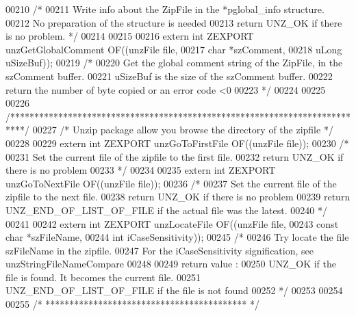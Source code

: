 \begin{DoxyCode}
00210 \textcolor{comment}{/*}
00211 \textcolor{comment}{  Write info about the ZipFile in the *pglobal\_info structure.}
00212 \textcolor{comment}{  No preparation of the structure is needed}
00213 \textcolor{comment}{  return UNZ\_OK if there is no problem. */}
00214 
00215 
00216 \textcolor{keyword}{extern} \textcolor{keywordtype}{int} ZEXPORT unzGetGlobalComment OF((unzFile file,
00217                                            \textcolor{keywordtype}{char} *szComment,
00218                                            uLong uSizeBuf));
00219 \textcolor{comment}{/*}
00220 \textcolor{comment}{  Get the global comment string of the ZipFile, in the szComment buffer.}
00221 \textcolor{comment}{  uSizeBuf is the size of the szComment buffer.}
00222 \textcolor{comment}{  return the number of byte copied or an error code <0}
00223 \textcolor{comment}{*/}
00224 
00225 
00226 \textcolor{comment}{/***************************************************************************/}
00227 \textcolor{comment}{/* Unzip package allow you browse the directory of the zipfile */}
00228 
00229 \textcolor{keyword}{extern} \textcolor{keywordtype}{int} ZEXPORT unzGoToFirstFile OF((unzFile file));
00230 \textcolor{comment}{/*}
00231 \textcolor{comment}{  Set the current file of the zipfile to the first file.}
00232 \textcolor{comment}{  return UNZ\_OK if there is no problem}
00233 \textcolor{comment}{*/}
00234 
00235 \textcolor{keyword}{extern} \textcolor{keywordtype}{int} ZEXPORT unzGoToNextFile OF((unzFile file));
00236 \textcolor{comment}{/*}
00237 \textcolor{comment}{  Set the current file of the zipfile to the next file.}
00238 \textcolor{comment}{  return UNZ\_OK if there is no problem}
00239 \textcolor{comment}{  return UNZ\_END\_OF\_LIST\_OF\_FILE if the actual file was the latest.}
00240 \textcolor{comment}{*/}
00241 
00242 \textcolor{keyword}{extern} \textcolor{keywordtype}{int} ZEXPORT unzLocateFile OF((unzFile file,
00243                      \textcolor{keyword}{const} \textcolor{keywordtype}{char} *szFileName,
00244                      \textcolor{keywordtype}{int} iCaseSensitivity));
00245 \textcolor{comment}{/*}
00246 \textcolor{comment}{  Try locate the file szFileName in the zipfile.}
00247 \textcolor{comment}{  For the iCaseSensitivity signification, see unzStringFileNameCompare}
00248 \textcolor{comment}{}
00249 \textcolor{comment}{  return value :}
00250 \textcolor{comment}{  UNZ\_OK if the file is found. It becomes the current file.}
00251 \textcolor{comment}{  UNZ\_END\_OF\_LIST\_OF\_FILE if the file is not found}
00252 \textcolor{comment}{*/}
00253 
00254 
00255 \textcolor{comment}{/* ****************************************** */}

\end{DoxyCode}
